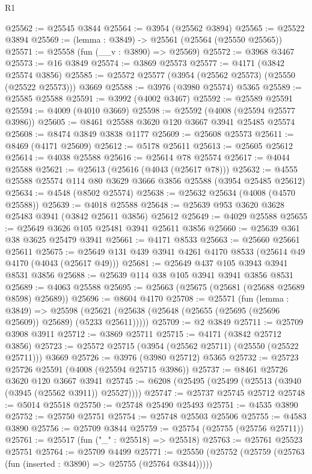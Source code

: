 \begin{lexlean}{R1}
\begin{coremodule}
@25562 := @25545 @3844
@25564 := @3954 (@25562 @3894)
@25565 := @25522 @3894
@25569 := (lemma : @3849) -> @25561 (@25564 (@25550 @25565))
@25571 := @25558 (fun (__v : @3890) => @25569)
@25572 := @3968 @3467
@25573 := @16 @3849
@25574 := @3869 @25573
@25577 := @4171 (@3842 @25574 @3856)
@25585 := @25572 @25577 (@3954 (@25562 @25573) (@25550 (@25522 @25573))) @3669
@25588 := @3976 (@3980 @25574) @5365
@25589 := @25585 @25588
@25591 := @3992 (@4002 @3467)
@25592 := @25589 @25591
@25594 := @4009 (@4010 @3669)
@25598 := @25592 (@4008 (@25594 @25577 @3986))
@25605 := @8461 @25588 @3620 @120 @3667 @3941 @25485 @25574
@25608 := @8474 @3849 @3838 @1177
@25609 := @25608 @25573
@25611 := @8469 (@4171 @25609)
@25612 := @5178 @25611
@25613 := @25605 @25612
@25614 := @4038 @25588
@25616 := @25614 @78 @25574
@25617 := @4044 @25588
@25621 := @25613 (@25616 (@4043 (@25617 @78)))
@25632 := @4555 @25588 @25574 @114 @80 @3629 @3666 @3856 @25588 (@3954 @25485 @25612)
@25634 := @4548 (@8502 @25574)
@25638 := @25632 @25634 (@4008 (@4570 @25588))
@25639 := @4018 @25588
@25648 := @25639 @953 @3620 @3628 @25483 @3941 (@3842 @25611 @3856) @25612
@25649 := @4029 @25588
@25655 := @25649 @3626 @105 @25481 @3941 @25611 @3856
@25660 := @25639 @361 @38 @3625 @25479 @3941
@25661 := @4171 @8533
@25663 := @25660 @25661 @25611
@25675 := @25649 @131 @439 @3941 @4261 @4170 @8533 (@25614 @49 @4170 (@4043 (@25617 @49)))
@25681 := @25649 @437 @105 @3943 @3941 @8531 @3856
@25688 := @25639 @114 @38 @105 @3941 @3941 @3856 @8531
@25689 := @4063 @25588
@25695 := @25663 (@25675 (@25681 (@25688 @25689 @8598) @25689))
@25696 := @8604 @4170
@25708 := @25571
    (fun (lemma : @3849) =>
    @25598 (@25621 (@25638 (@25648 (@25655 (@25695 (@25696 @25609)) @25689) (@5233 @25611)))))
@25709 := @2 @3849
@25711 := @25709 @3908 @3911
@25712 := @3869 @25711
@25715 := @4171 (@3842 @25712 @3856)
@25723 := @25572 @25715 (@3954 (@25562 @25711) (@25550 (@25522 @25711))) @3669
@25726 := @3976 (@3980 @25712) @5365
@25732 := @25723 @25726 @25591 (@4008 (@25594 @25715 @3986))
@25737 := @8461 @25726 @3620 @120 @3667 @3941
@25745 := @6208 (@25495 (@25499 (@25513 (@3940 (@3945 (@25562 @3911)) @25527))))
@25747 := @25737 @25745 @25712
@25748 := @5014 @25518
@25750 := @25748 @25490 @25493
@25751 := @4535 @3890
@25752 := @25750 @25751
@25754 := @25748 @25503 @25506
@25755 := @4583 @3890
@25756 := @25709 @3844
@25759 := @25754 (@25755 (@25756 @25711))
@25761 := @25517 (fun ("_" : @25518) => @25518)
@25763 := @25761 @25523 @25751
@25764 := @25709 @4499
@25771 := @25550 (@25752 (@25759 (@25763 (fun (inserted : @3890) => @25755 (@25764 @3844)))))

\end{coremodule}
\end{lexlean}
